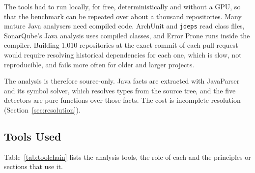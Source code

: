 The tools had to run locally, for free, deterministically and without a GPU, so that the benchmark
can be repeated over about a thousand repositories. Many mature Java analysers need compiled code.
ArchUnit and \texttt{jdeps} read class files, SonarQube's Java analysis uses compiled classes, and
Error Prone runs inside the compiler. Building 1{,}010 repositories at the exact commit of each pull
request would require resolving historical dependencies for each one, which is slow, not
reproducible, and fails more often for older and larger projects.

The analysis is therefore source-only. Java facts are extracted with JavaParser and its symbol
solver, which resolves types from the source tree, and the five detectors are pure functions over
those facts. The cost is incomplete resolution (Section~\ref{sec:resolution}).

\subsection{Tools Used}

Table~\ref{tab:toolchain} lists the analysis tools, the role of each and the principles or sections
that use it.

